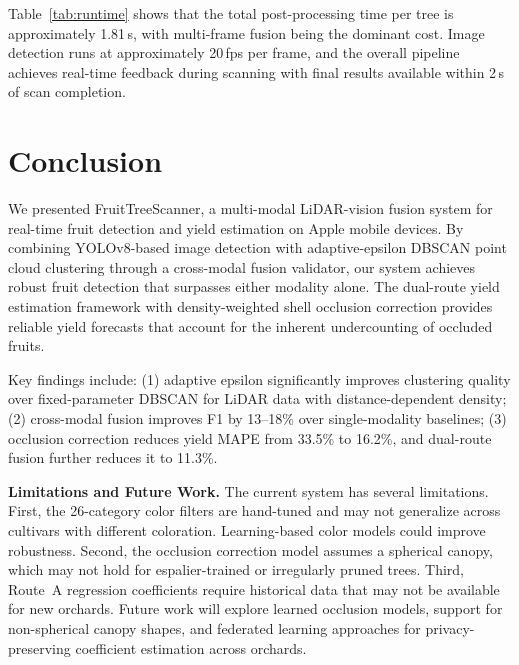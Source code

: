 \documentclass[article,final]{iclr2024_conference}
\newcommand{\theMethod}{FruitTreeScanner}
\begin{document}
Table~\ref{tab:runtime} shows that the total post-processing time per tree is approximately 1.81\,s, with multi-frame fusion being the dominant cost. Image detection runs at approximately 20\,fps per frame, and the overall pipeline achieves real-time feedback during scanning with final results available within 2\,s of scan completion.

\section{Conclusion}
\label{sec:conclusion}

We presented \theMethod{}, a multi-modal LiDAR-vision fusion system for real-time fruit detection and yield estimation on Apple mobile devices. By combining YOLOv8-based image detection with adaptive-epsilon DBSCAN point cloud clustering through a cross-modal fusion validator, our system achieves robust fruit detection that surpasses either modality alone. The dual-route yield estimation framework with density-weighted shell occlusion correction provides reliable yield forecasts that account for the inherent undercounting of occluded fruits.

Key findings include: (1) adaptive epsilon significantly improves clustering quality over fixed-parameter DBSCAN for LiDAR data with distance-dependent density; (2) cross-modal fusion improves F1 by 13--18\% over single-modality baselines; (3) occlusion correction reduces yield MAPE from 33.5\% to 16.2\%, and dual-route fusion further reduces it to 11.3\%.

\textbf{Limitations and Future Work.}
The current system has several limitations. First, the 26-category color filters are hand-tuned and may not generalize across cultivars with different coloration. Learning-based color models could improve robustness. Second, the occlusion correction model assumes a spherical canopy, which may not hold for espalier-trained or irregularly pruned trees. Third, Route~A regression coefficients require historical data that may not be available for new orchards. Future work will explore learned occlusion models, support for non-spherical canopy shapes, and federated learning approaches for privacy-preserving coefficient estimation across orchards.



\end{document}
